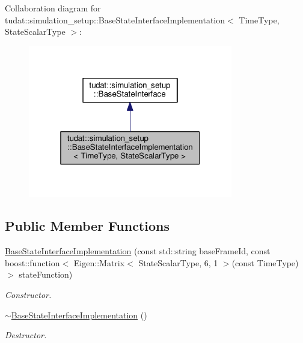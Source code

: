 Collaboration diagram for tudat\+:\+:simulation\+\_\+setup\+:\+:Base\+State\+Interface\+Implementation$<$ Time\+Type, State\+Scalar\+Type $>$\+:
\nopagebreak
\begin{figure}[H]
\begin{center}
\leavevmode
\includegraphics[width=253pt]{classtudat_1_1simulation__setup_1_1BaseStateInterfaceImplementation__coll__graph}
\end{center}
\end{figure}
\subsection*{Public Member Functions}
\begin{DoxyCompactItemize}
\item 
\hyperlink{classtudat_1_1simulation__setup_1_1BaseStateInterfaceImplementation_a93a176a72a12fcd0a16d40c7def9c466}{Base\+State\+Interface\+Implementation} (const std\+::string base\+Frame\+Id, const boost\+::function$<$ Eigen\+::\+Matrix$<$ State\+Scalar\+Type, 6, 1 $>$(const Time\+Type) $>$ state\+Function)
\begin{DoxyCompactList}\small\item\em Constructor. \end{DoxyCompactList}\item 
\hyperlink{classtudat_1_1simulation__setup_1_1BaseStateInterfaceImplementation_a7f082ae2a3552dcdf8cdfccb7f9454e3}{$\sim$\+Base\+State\+Interface\+Implementation} ()\hypertarget{classtudat_1_1simulation__setup_1_1BaseStateInterfaceImplementation_a7f082ae2a3552dcdf8cdfccb7f9454e3}{}\label{classtudat_1_1simulation__setup_1_1BaseStateInterfaceImplementation_a7f082ae2a3552dcdf8cdfccb7f9454e3}

\begin{DoxyCompactList}\small\item\em Destructor. \end{DoxyCompactList}\end{DoxyCompactItemize}

